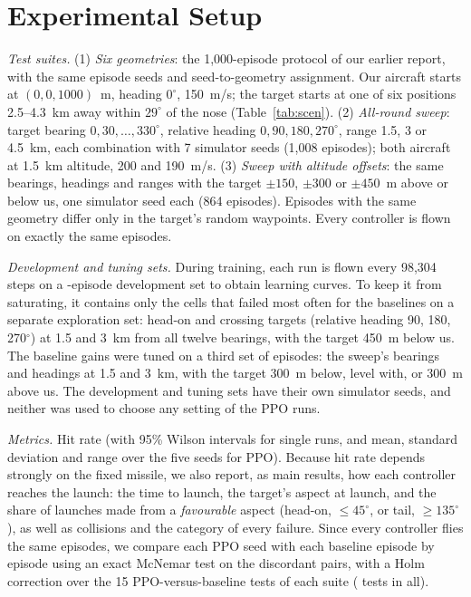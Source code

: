 \documentclass[conference]{IEEEtran}
\begin{document}
\section{Experimental Setup}\label{sec:setup}
\emph{Test suites.} (1) \emph{Six geometries}: the 1,000-episode protocol of our earlier report, with the same episode seeds and seed-to-geometry assignment. Our aircraft starts at $(0,0,1000)$~m, heading $0^\circ$, 150~m/s; the target starts at one of six positions 2.5--4.3~km away within $29^\circ$ of the nose (Table~\ref{tab:scen}). (2) \emph{All-round sweep}: target bearing $0,30,\dots,330^\circ$, relative heading $0,90,180,270^\circ$, range 1.5, 3 or 4.5~km, each combination with 7 simulator seeds (1,008 episodes); both aircraft at 1.5~km altitude, 200 and 190~m/s. (3) \emph{Sweep with altitude offsets}: the same bearings, headings and ranges with the target $\pm150$, $\pm300$ or $\pm450$~m above or below us, one simulator seed each (864 episodes). Episodes with the same geometry differ only in the target's random waypoints. Every controller is flown on exactly the same \REpisodesPerRun{} episodes.

\emph{Development and tuning sets.} During training, each run is flown every 98,304 steps on a \RDevEpisodes-episode development set to obtain learning curves. To keep it from saturating, it contains only the cells that failed most often for the baselines on a separate exploration set: head-on and crossing targets (relative heading 90, 180, 270$^\circ$) at 1.5 and 3~km from all twelve bearings, with the target 450~m below us. The baseline gains were tuned on a third set of \RTuneEpisodes{} episodes: the sweep's bearings and headings at 1.5 and 3~km, with the target 300~m below, level with, or 300~m above us. The development and tuning sets have their own simulator seeds, and neither was used to choose any setting of the PPO runs.

\emph{Metrics.} Hit rate (with 95\% Wilson intervals \cite{wilson1927} for single runs, and mean, standard deviation and range over the five seeds for PPO). Because hit rate depends strongly on the fixed missile, we also report, as main results, how each controller reaches the launch: the time to launch, the target's aspect at launch, and the share of launches made from a \emph{favourable} aspect (head-on, $\le45^\circ$, or tail, $\ge135^\circ$), as well as collisions and the category of every failure. Since every controller flies the same episodes, we compare each PPO seed with each baseline episode by episode using an exact McNemar test on the discordant pairs, with a Holm correction over the 15 PPO-versus-baseline tests of each suite (\RPairedTests{} tests in all).
\end{document}
